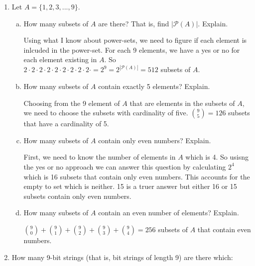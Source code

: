 \documentclass[11pt, a4paper]{article}
\newcommand\setItemNumber[1]{\setcounter{enumi}{\numexpr#1-1\relax}}
\begin{document}
    \begin{enumerate}

        \setItemNumber{3}
        \item Let $A = \{1,2,3,...,9\}$.

            \begin{enumerate}[(a)]

                \item How many subsets of $A$ are there? That is, find $|\mathcal{P}(A)|$. Explain.

                    Using what I know about power-sets, we need to figure if each element is inlcuded in the power-set. For each 9 elements, we have a yes or no for each element existing in $A$. So $2 \cdot 2 \cdot 2 \cdot 2 \cdot 2 \cdot 2 \cdot 2 \cdot 2 \cdot 2 \cdot = 2^9 = 2^{|\mathcal{P}(A)|} = 512$ subsets of $A$.

                \item How many subsets of $A$ contain exactly 5 elements? Explain.

                    Choosing from the 9 element of $A$ that are elements in the subsets of $A$, we need to choose the subsets with cardinality of five. ${9 \choose 5} = 126$ subsets that have a cardinality of 5.

                \item How many subsets of $A$ contain only even numbers? Explain.

                    First, we need to know the number of elements in $A$ which is 4. So usisng the yes or no approach we can answer this question by calculating $2^4$ which is 16 subsets that contain only even numbers. This accounts for the empty to set which is neither. 15 is a truer answer but either 16 or 15 subsets contain only even numbers.

                \item How many subsets of $A$ contain an even number of elements? Explain.

                    ${9\choose 0} + {9\choose 1} + {9\choose 2} + {9\choose 3} + {9\choose  4} = 256$ subsets of $A$ that contain even numbers.

            \end{enumerate}

        \item How many 9-bit strings (that is, bit strings of length 9) are there which:

            \begin{enumerate}[(a)]


\end{enumerate}
\end{enumerate}
\end{document}
